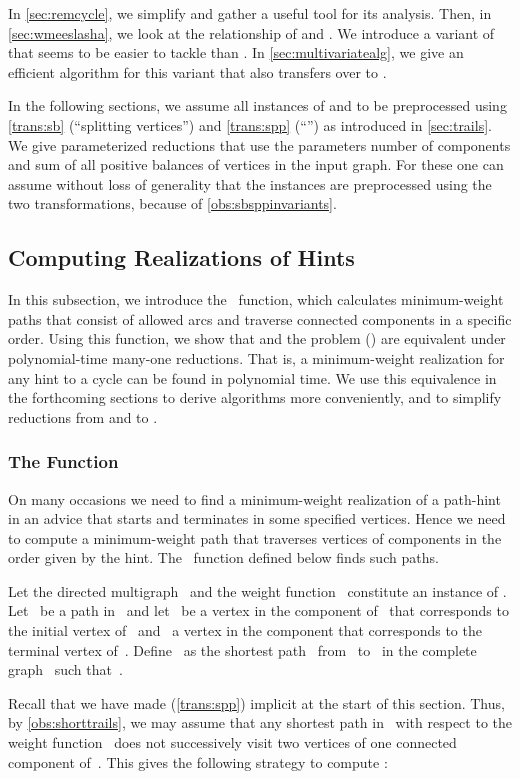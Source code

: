 In \autoref{sec:remcycle}, we simplify \pWMEEAs{} and gather a useful tool for its analysis. Then, in \autoref{sec:wmeeslasha}, we look at the relationship of \pWMEEs{} and \pWMEEAs{}. We introduce a variant of \pWMEEAs{} that seems to be easier to tackle than \pWMEEs{}. In \autoref{sec:multivariatealg}, we give an efficient algorithm for this variant that also transfers over to \pWMEEs{}. 

In the following sections, we assume all instances of \pWMEEs{} and \pWMEEAs{} to be preprocessed using \autoref{trans:sb} (``splitting vertices'') and \autoref{trans:spp} (``\SPP{}'') as introduced in \autoref{sec:trails}. We give parameterized reductions that use the parameters number of components and sum of all positive balances of vertices in the input graph. For these one can assume without loss of generality that the instances are preprocessed using the two transformations, because of \autoref{obs:sbsppinvariants}. 


\subsection{Computing Realizations of Hints}\label{sec:remcycle}
In this subsection, we introduce the ~function, which calculates minimum-weight paths that consist of allowed arcs and traverse connected components in a specific order. Using this function, we show that \pWMEEAs{} and the problem \pWMEECLA{} (\pWMEECLAs{}) are equivalent under polynomial-time many-one reductions. That is, a minimum-weight realization for any hint to a cycle can be found in polynomial time. We use this equivalence in the forthcoming sections to derive algorithms more conveniently, and to simplify reductions from and to \pWMEEAs{}.

\subsubsection{The  Function}
On many occasions we need to find a minimum-weight realization of a path-hint in an advice that starts and terminates in some specified vertices. Hence we need to compute a minimum-weight path that traverses vertices of components in the order given by the hint. The~ function defined below finds such paths.
\begin{definition}\label{def:minpath}
  Let the directed multigraph~ and the weight function~ constitute an instance of \pWMEEs{}. Let~ be a path in~ and let~ be a vertex in the component of~ that corresponds to the initial vertex of~ and~ a vertex in the component that corresponds to the terminal vertex of~. Define~ as the shortest path~ from~ to~ in the complete graph~ such that~.
\end{definition} Recall that we have made \SPP{} (\autoref{trans:spp}) implicit at the start of this section. Thus, by \autoref{obs:shorttrails}, we may assume that any shortest path in~ with respect to the weight function~ does not successively visit two vertices of one connected component of~. This gives the following strategy to compute :

